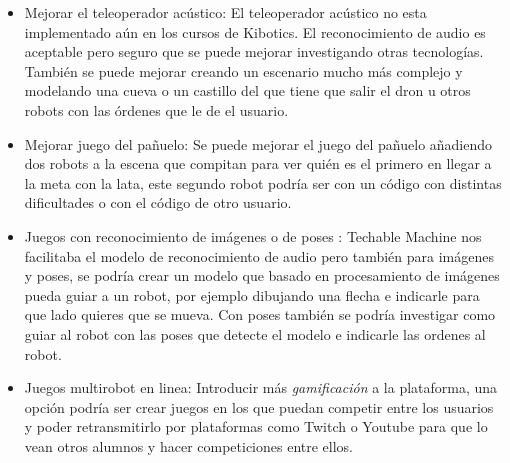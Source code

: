 \begin{itemize}
\item Mejorar el teleoperador acústico: El teleoperador acústico no esta implementado aún en los cursos de  Kibotics. El reconocimiento de audio es aceptable pero seguro que se puede mejorar investigando otras tecnologías. También se puede mejorar creando un escenario mucho más complejo y modelando una cueva o un castillo del que tiene que salir el dron u otros robots con las órdenes que le de el usuario.

\item Mejorar juego del pañuelo: Se puede mejorar el juego del pañuelo añadiendo dos robots a la escena que compitan para ver quién es el primero en llegar a la meta con la lata, este segundo robot podría ser con un código con distintas dificultades o con el código de otro usuario.

\item  Juegos con reconocimiento de imágenes o de poses : Techable Machine nos facilitaba el modelo de reconocimiento de audio pero también para imágenes y poses, se podría crear un modelo que basado en procesamiento de imágenes pueda guiar a un robot, por ejemplo dibujando una flecha e indicarle para que lado quieres que se mueva. Con poses también se podría investigar como guiar al robot con las poses que detecte el modelo e indicarle las ordenes al robot.

\item Juegos multirobot en linea: Introducir más \textit{gamificación} a la plataforma, una opción podría ser crear juegos en los que puedan competir entre los usuarios y poder retransmitirlo por plataformas como Twitch o Youtube para que lo vean otros alumnos y hacer competiciones entre ellos.


\end{itemize}
